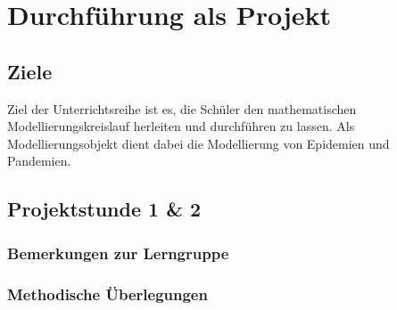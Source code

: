 \section{Durchführung als Projekt}
\subsection{Ziele}
\steffen
Ziel der Unterrichtsreihe ist es, die Schüler den mathematischen Modellierungskreislauf herleiten und durchführen zu lassen. Als Modellierungsobjekt dient dabei die Modellierung von Epidemien und Pandemien. 



\subsection{Projektstunde 1 \& 2}\ellen
\subsubsection{Bemerkungen zur Lerngruppe}
\subsubsection{Methodische Überlegungen}

